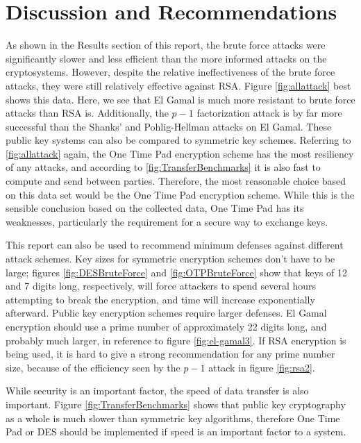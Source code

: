 \documentclass[12pt]{report}
\begin{document}
\section{Discussion and Recommendations}
As shown in the Results section of this report, the brute force attacks were significantly slower and less efficient than the more informed attacks on the
cryptosystems. However, despite the relative ineffectiveness of the brute force attacks, they were still relatively effective against RSA. Figure
\ref{fig:allattack} best shows this data. Here, we see that El Gamal is much more resistant to brute force attacks than RSA is. Additionally, the $p-1$
factorization attack is by far more successful than the Shanks' and Pohlig-Hellman attacks on El Gamal. These public key systems can also be compared to symmetric
key schemes. Referring to \ref{fig:allattack} again, the One Time Pad encryption scheme has the most resiliency of any attacks, and according to
\ref{fig:TransferBenchmarks} it is also fast to compute and send between parties. Therefore, the most reasonable choice based on this data set would be the
One Time Pad encryption scheme. While this is the sensible conclusion based on the collected data, One Time Pad has its weaknesses, particularly the requirement
for a secure way to exchange keys.

This report can also be used to recommend minimum defenses against different attack schemes. Key sizes for symmetric encryption schemes don't have to be large;
figures \ref{fig:DESBruteForce} and \ref{fig:OTPBruteForce} show that keys of 12 and 7 digits long, respectively, will force attackers to spend several hours
attempting to break the encryption, and time will increase exponentially afterward. Public key encryption schemes require larger defenses. El Gamal encryption
should use a prime number of approximately 22 digits long, and probably much larger, in reference to figure \ref{fig:el-gamal3}. If RSA encryption is being used,
it is hard to give a strong recommendation for any prime number size, because of the efficiency seen by the $p-1$ attack in figure \ref{fig:rsa2}.

While security is an important factor, the speed of data transfer is also important. Figure \ref{fig:TransferBenchmarks} shows that public key cryptography as
a whole is much slower than symmetric key algorithms, therefore One Time Pad or DES should be implemented if speed is an important factor to a system.
\end{document}

